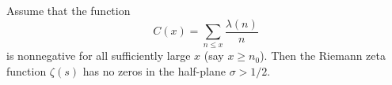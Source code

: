 Assume that the function
$$
C(x) = \sum_{n \leq x} \frac{\lambda(n)}{n}
$$
is nonnegative for all sufficiently large $x$ (say $x \geq n_0$). Then the Riemann zeta function $\zeta(s)$ has no zeros in the half-plane $\sigma > 1/2$.
